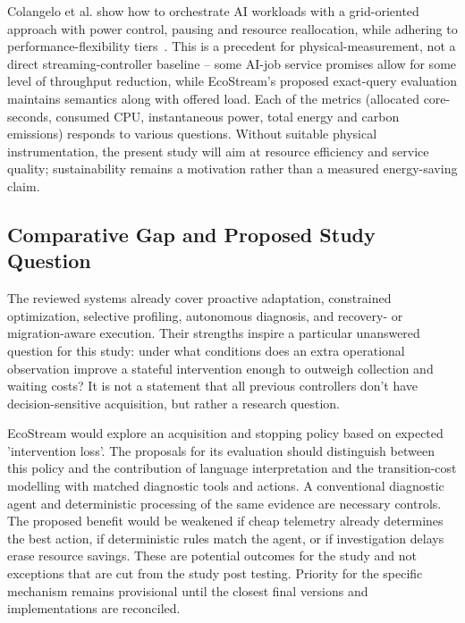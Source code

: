 Colangelo et al. show how to orchestrate AI workloads with a grid-oriented approach with power control, pausing and resource reallocation, while adhering to performance-flexibility tiers~\cite{colangelo2026grid}. This is a precedent for physical-measurement, not a direct streaming-controller baseline – some AI-job service promises allow for some level of throughput reduction, while EcoStream's proposed exact-query evaluation maintains semantics along with offered load. Each of the metrics (allocated core-seconds, consumed CPU, instantaneous power, total energy and carbon emissions) responds to various questions. Without suitable physical instrumentation, the present study will aim at resource efficiency and service quality; sustainability remains a motivation rather than a measured energy-saving claim.

\subsection{Comparative Gap and Proposed Study Question}
The reviewed systems already cover proactive adaptation, constrained optimization, selective profiling, autonomous diagnosis, and recovery- or migration-aware execution. Their strengths inspire a particular unanswered question for this study: under what conditions does an extra operational observation improve a stateful intervention enough to outweigh collection and waiting costs? It is not a statement that all previous controllers don't have decision-sensitive acquisition, but rather a research question.

EcoStream would explore an acquisition and stopping policy based on expected 'intervention loss'. The proposals for its evaluation should distinguish between this policy and the contribution of language interpretation and the transition-cost modelling with matched diagnostic tools and actions. A conventional diagnostic agent and deterministic processing of the same evidence are necessary controls. The proposed benefit would be weakened if cheap telemetry already determines the best action, if deterministic rules match the agent, or if investigation delays erase resource savings. These are potential outcomes for the study and not exceptions that are cut from the study post testing. Priority for the specific mechanism remains provisional until the closest final versions and implementations are reconciled.

